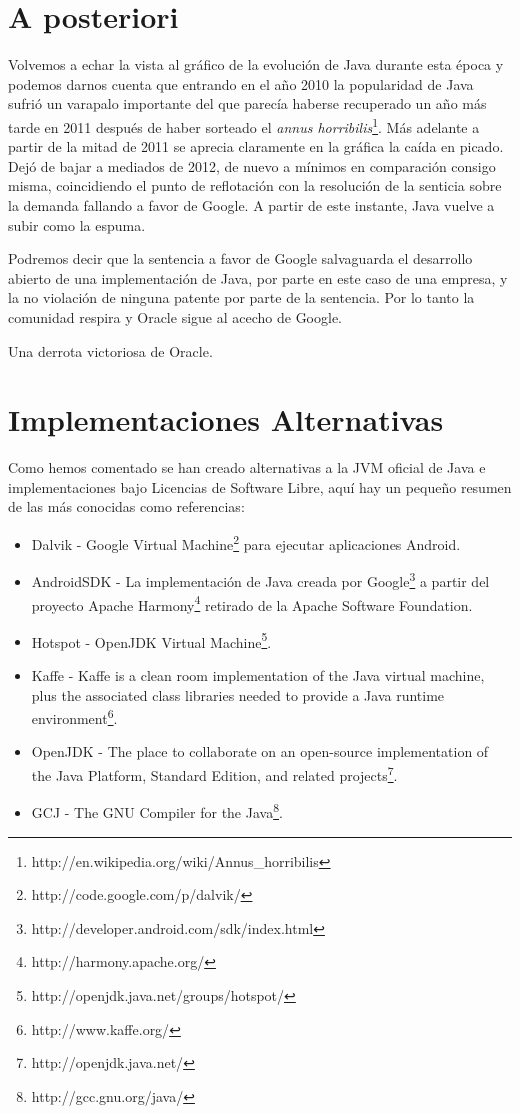 \documentclass[11pt]{scrartcl}
\begin{document}
\section{A posteriori}

Volvemos a echar la vista al gráfico de la evolución de Java durante esta época y podemos darnos cuenta que entrando en el año 2010 la popularidad de Java sufrió un varapalo importante del que parecía haberse recuperado un año más tarde en 2011 después de haber sorteado el \emph{annus horribilis}\footnote{http://en.wikipedia.org/wiki/Annus\_horribilis}. Más adelante a partir de la mitad de 2011 se aprecia claramente en la gráfica la caída en picado. Dejó de bajar a mediados de 2012, de nuevo a mínimos en comparación consigo misma, coincidiendo el punto de reflotación con la resolución de la senticia sobre la demanda fallando a favor de Google. A partir de este instante, Java vuelve a subir como la espuma.

Podremos decir que la sentencia a favor de Google salvaguarda el desarrollo abierto de una implementación de Java, por parte en este caso de una empresa, y la no violación de ninguna patente por parte de la sentencia. Por lo tanto la comunidad respira y Oracle sigue al acecho de Google.

Una derrota victoriosa de Oracle.

\section{Implementaciones Alternativas}

Como hemos comentado se han creado alternativas a la JVM oficial de Java e implementaciones bajo Licencias de Software Libre, aquí hay un pequeño resumen de las más conocidas como referencias:
\begin{itemize}
    \item Dalvik - Google Virtual Machine\footnote{http://code.google.com/p/dalvik/} para ejecutar aplicaciones Android.
    \item AndroidSDK - La implementación de Java creada por Google\footnote{http://developer.android.com/sdk/index.html} a partir del proyecto Apache Harmony\footnote{http://harmony.apache.org/} retirado de la Apache Software Foundation.
    \item Hotspot - OpenJDK Virtual Machine\footnote{http://openjdk.java.net/groups/hotspot/}.
    \item Kaffe - Kaffe is a clean room implementation of the Java virtual machine, plus the associated class libraries needed to provide a Java runtime environment\footnote{http://www.kaffe.org/}.
    \item OpenJDK - The place to collaborate on an open-source implementation of the Java Platform, Standard Edition, and related projects\footnote{http://openjdk.java.net/}.
    \item GCJ - The GNU Compiler for the Java\footnote{http://gcc.gnu.org/java/}.
\end{itemize}
\end{document}
